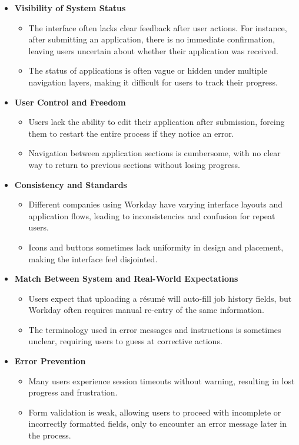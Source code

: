 \documentclass[
	letterpaper, %
]{jdf}
\begin{document}
\begin{itemize}
    \item \textbf{Visibility of System Status}  
    \begin{itemize}
        \item The interface often lacks clear feedback after user actions. For instance, after submitting an application, there is no immediate confirmation, leaving users uncertain about whether their application was received.
        \item The status of applications is often vague or hidden under multiple navigation layers, making it difficult for users to track their progress.
    \end{itemize}

    \item \textbf{User Control and Freedom}  
    \begin{itemize}
        \item Users lack the ability to edit their application after submission, forcing them to restart the entire process if they notice an error.
        \item Navigation between application sections is cumbersome, with no clear way to return to previous sections without losing progress.
    \end{itemize}

    \item \textbf{Consistency and Standards}  
    \begin{itemize}
        \item Different companies using Workday have varying interface layouts and application flows, leading to inconsistencies and confusion for repeat users.
        \item Icons and buttons sometimes lack uniformity in design and placement, making the interface feel disjointed.
    \end{itemize}

    \item \textbf{Match Between System and Real-World Expectations}  
    \begin{itemize}
        \item Users expect that uploading a résumé will auto-fill job history fields, but Workday often requires manual re-entry of the same information.
        \item The terminology used in error messages and instructions is sometimes unclear, requiring users to guess at corrective actions.
    \end{itemize}

    \item \textbf{Error Prevention}  
    \begin{itemize}
        \item Many users experience session timeouts without warning, resulting in lost progress and frustration.
        \item Form validation is weak, allowing users to proceed with incomplete or incorrectly formatted fields, only to encounter an error message later in the process.
    \end{itemize}
\end{itemize}
\end{document}
